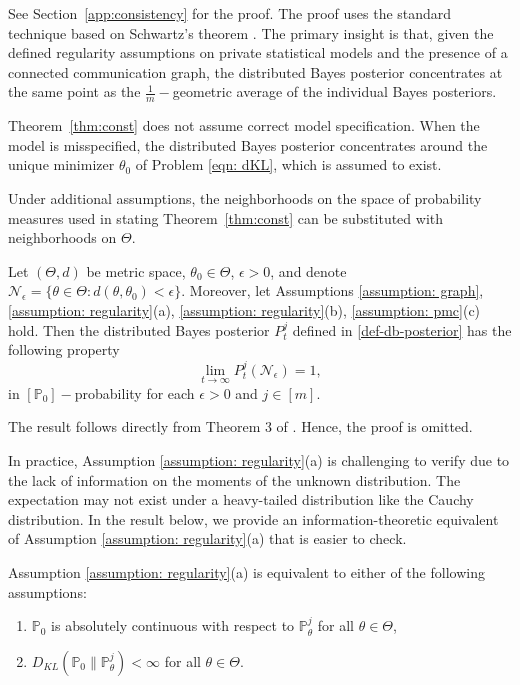 \documentclass[twoside,11pt]{article}
\numberwithin{equation}{section}
\newcommand\bP{\mathbb{P}}
\begin{document}
{See Section~\ref{app:consistency} for the proof. The proof uses the standard technique based on Schwartz's theorem \citep{miller2021asymptotic}. The primary insight is that, given the defined regularity assumptions on private statistical models and the presence of a connected communication graph, the distributed Bayes posterior concentrates at the same point as the $\frac{1}{m}-$geometric average of the individual Bayes posteriors. 

Theorem~\ref{thm:const} does not assume correct model specification. When the model is misspecified, the distributed Bayes posterior concentrates around the unique minimizer $\theta_0$ of Problem \eqref{eqn: dKL}, which is assumed to exist. 

Under additional assumptions,  the neighborhoods on the space of probability measures used in stating Theorem~\ref{thm:const} can be substituted with neighborhoods on $\Theta$. 

{
\begin{corollary} \label{cor:const-1}
Let $(\Theta, d)$ be metric space, $\theta_0 \in \Theta$, $\epsilon>0$, and denote $\mathcal N_\epsilon = \{\theta \in \Theta:d(\theta, \theta_0) < \epsilon\}$.   Moreover, let Assumptions \ref{assumption: graph}, \ref{assumption: regularity}(a), \ref{assumption: regularity}(b), \ref{assumption: pmc}(c) hold.  Then the distributed Bayes posterior $P_t^j$ defined in \eqref{def-db-posterior} has the following property
\begin{equation*}
    \lim_{t \to \infty} P_t^j(\mathcal N_\epsilon) = 1, 
\end{equation*}
in $[\bP_0]-$probability for each $\epsilon > 0$ and $j \in [m]$. 
\end{corollary}
}

The result follows directly from Theorem 3 of \cite{miller2021asymptotic}. Hence, the proof is omitted. 


{In practice, Assumption \ref{assumption: regularity}(a) is challenging to verify due to the lack of information on the moments of the unknown distribution. The expectation may not exist under a heavy-tailed distribution like the Cauchy distribution.} In the result below, we provide an information-theoretic equivalent of Assumption \ref{assumption: regularity}(a) that is easier to check.
\begin{lemma}
\label{lemma:const_condition}
Assumption \ref{assumption: regularity}(a) is equivalent to either of the following assumptions:
\begin{enumerate}
\item[(a).] $\bP_0$ is absolutely continuous with respect to $\bP_\theta^j$ for all $\theta \in \Theta$,
\item[(b).] $D_{KL}(\bP_0 \parallel \bP_\theta^j) < \infty$ for all $\theta \in \Theta$. 
\end{enumerate}
\end{lemma}

}
\end{document}
